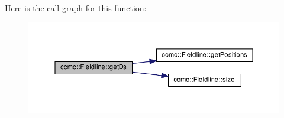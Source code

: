 Here is the call graph for this function\-:
\nopagebreak
\begin{figure}[H]
\begin{center}
\leavevmode
\includegraphics[width=350pt]{classccmc_1_1_fieldline_af89e2d72b06b4e7157d3f7e5ac1b4928_cgraph}
\end{center}
\end{figure}


